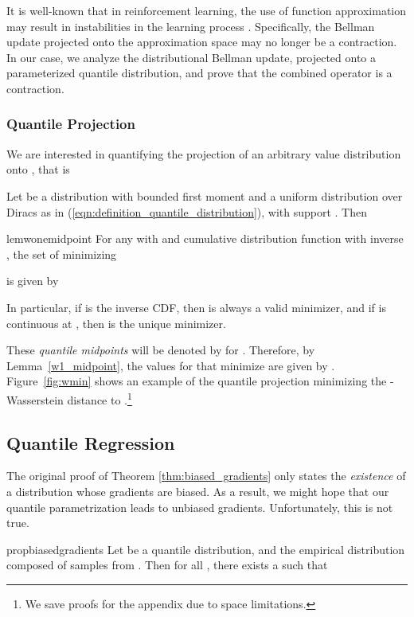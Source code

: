\documentclass[letterpaper]{article}
\newcommand{\eqnref}[1]{(\ref{eqn:#1})}
\begin{document}
It is well-known that in reinforcement learning, the use of function approximation may result in instabilities in the learning process \cite{tsitsiklis97analysis}. Specifically, the Bellman update projected onto the approximation space may no longer be a contraction. In our case, we analyze the distributional Bellman update, projected onto a parameterized quantile distribution, and prove that the combined operator is a contraction.

\subsubsection{Quantile Projection}

We are interested in quantifying the projection of an arbitrary value distribution  onto , that is


Let  be a distribution with bounded first moment and  a uniform distribution over  Diracs as in \eqnref{definition_quantile_distribution}, with support . Then

\begin{restatable}{lem}{wonemidpoint}\label{w1_midpoint}
For any  with  and cumulative distribution function  with inverse , the set of  minimizing

is given by

In particular, if  is the inverse CDF, then  is always a valid minimizer, and if  is continuous at , then  is the unique minimizer.
\end{restatable}

These \textit{quantile midpoints} will be denoted by  for .
Therefore, by Lemma~\ref{w1_midpoint}, the values for  that minimize  are given by . Figure~\ref{fig:wmin} shows an example of the quantile projection  minimizing the -Wasserstein distance to .\footnote{We save proofs for the appendix due to space limitations.}

\subsection{Quantile Regression}

The original proof of Theorem \ref{thm:biased_gradients} only states the \emph{existence} of a distribution whose gradients are biased. As a result, we might hope that our quantile parametrization leads to unbiased gradients. Unfortunately, this is not true.
\begin{restatable}{prop}{biasedgradients}\label{prop:biased_transpose_gradients}
Let  be a quantile distribution, and  the empirical distribution composed of  samples from . Then for all , there exists a  such that

\end{restatable}
\end{document}
